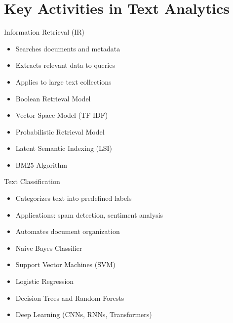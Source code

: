 \section{Key Activities in Text Analytics}
\begin{frame}{Information Retrieval (IR)}

\begin{multicols}{2}
\begin{itemize}
    \item Searches documents and metadata
    \item Extracts relevant data to queries
    \item Applies to large text collections
\end{itemize}
\vfill\null \columnbreak
\begin{itemize}
    \item Boolean Retrieval Model
    \item Vector Space Model (TF-IDF)
    \item Probabilistic Retrieval Model
    \item Latent Semantic Indexing (LSI)
    \item BM25 Algorithm
\end{itemize}

\end{multicols}
\end{frame}

\begin{frame}{Text Classification}
\begin{multicols}{2}
\begin{itemize}
    \item Categorizes text into predefined labels
    \item Applications: spam detection, sentiment analysis
    \item Automates document organization
\end{itemize}
\vfill\null\columnbreak
\begin{itemize}
    \item Naive Bayes Classifier
    \item Support Vector Machines (SVM)
    \item Logistic Regression
    \item Decision Trees and Random Forests
    \item Deep Learning (CNNs, RNNs, Transformers)
\end{itemize}
\end{multicols}
\end{frame}

